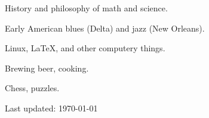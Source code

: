 \documentclass[11pt,letterpaper,twoside]{article}
\begin{document}
\begin{list}{}{\leftmargin=0pt}
  \item History and philosophy of math and science.
  \item Early American blues (Delta) and jazz (New Orleans).
  \item Linux, \LaTeX{}, and other computery things.
  \item Brewing beer, cooking.
  \item Chess, puzzles.
\end{list}

\null\hfill {\footnotesize Last updated: \today}
\end{document}
